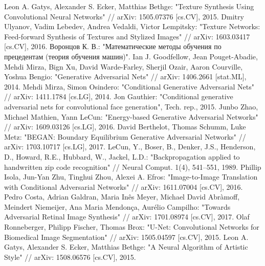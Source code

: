 \documentclass[a4paper]{article}
\begin{document}
	
	\setcounter{page}{2}
	\tableofcontents
	
	
	
	
	
	
	
	
	
	
	\begin{thebibliography}{99}
		 Leon A. Gatys, Alexander S. Ecker, Matthias Bethge: "Texture Synthesis Using Convolutional Neural Networks" // arXiv: 1505.07376 [cs.CV], 2015.
		 Dmitry Ulyanov, Vadim Lebedev, Andrea Vedaldi, Victor Lempitsky: "Texture Networks: Feed-forward Synthesis of Textures and Stylized Images" // arXiv: 1603.03417 [cs.CV], 2016.
		  Воронцов К. В.: "Математические методы обучения по прецедентам (теория обучения машин)".
		 Ian J. Goodfellow, Jean Pouget-Abadie, Mehdi Mirza, Bign Xu, David Warde-Farley, Sherjil Ozair, Aaron Courville, Yoshua Bengio: "Generative Adversarial Nets" // arXiv: 1406.2661 [stat.ML], 2014.
		 Mehdi Mirza, Simon Osindero: "Conditional Generative Adversarial Nets" // arXiv: 1411.1784 [cs.LG], 2014.
		 Jon Gauthier: "Conditional generative adversarial nets for convolutional face generation", Tech. rep., 2015.
		 Junbo Zhao, Michael Mathien, Yann LeCun: "Energy-based Generative Adversarial Networks" // arXiv: 1609.03126 [cs.LG], 2016.
		 David Berthelot, Thomas Schumm, Luke Metz: "BEGAN: Boundary Equilibrium Generative Adversarial Networks" // arXiv: 1703.10717 [cs.LG], 2017.
		 LeCun, Y., Boser, B., Denker, J.S., Henderson, D., Howard, R.E., Hubbard, W., Jackel, L.D.: "Backpropagation applied to handwritten zip code recognition" // Neural Comput. 1(4), 541–551, 1989.
		 Phillip Isola, Jun-Yan Zhu, Tinghui Zhou, Alexei A. Efros: "Image-to-Image Translation with Conditional Adversarial Networks" // arXiv: 1611.07004 [cs.CV], 2016.
		 Pedro Costa, Adrian Galdran, Maria Inês Meyer, Michael David Abràmoff, Meindert Niemeijer, Ana Maria Mendonça, Aurélio Campilho: "Towards Adversarial Retinal Image Synthesis" // arXiv: 1701.08974 [cs.CV], 2017.
		 Olaf Ronneberger, Philipp Fischer, Thomas Brox: "U-Net: Convolutional Networks for Biomedical Image Segmentation" // arXiv: 1505.04597 [cs.CV], 2015.
		 Leon A. Gatys, Alexander S. Ecker, Matthias Bethge: "A Neural Algorithm of Artistic Style" // arXiv: 1508.06576 [cs.CV], 2015.
		

\end{thebibliography}
\end{document}
